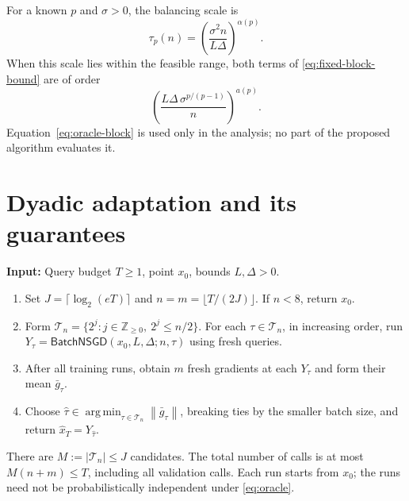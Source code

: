 \documentclass[11pt,a4paper]{article}
\newcommand{\cT}{\mathcal{T}}
\newcommand{\norm}[1]{\left\lVert #1\right\rVert}
\newcommand{\FB}{\mathsf{BatchNSGD}}
\DeclareMathOperator*{\argmin}{arg\,min}
\theoremstyle{definition}
\theoremstyle{remark}
\begin{document}
For a known $p$ and $\sigma>0$, the balancing scale is
\begin{equation}\label{eq:oracle-block}
 \tau_p(n)=\left(\frac{\sigma^2n}{L\Delta}\right)^{\alpha(p)}.
\end{equation}
When this scale lies within the feasible range, both terms of
\eqref{eq:fixed-block-bound} are of order
\begin{equation}\label{eq:balanced-value}
 \left(\frac{L\Delta\,\sigma^{p/(p-1)}}{n}\right)^{a(p)}.
\end{equation}
Equation~\eqref{eq:oracle-block} is used only in the analysis; no part
of the proposed algorithm evaluates it.

\section{Dyadic adaptation and its guarantees}\label{sec:main-upper}

\begin{algorithm}[H]
\caption{Dyadic batch-size portfolio $\mathsf A_{\rm dyad}$}
\label{alg:portfolio}
\textbf{Input:} Query budget $T\ge1$, point $x_0$, bounds $L,\Delta>0$.
\begin{enumerate}[label=\arabic*.,itemsep=0.25em,topsep=0.3em]
\item Set $J=\lceil\log_2(eT)\rceil$ and
$n=m=\lfloor T/(2J)\rfloor$. If $n<8$, return $x_0$.
\item Form $\cT_n=\{2^j:j\in\mathbb Z_{\ge0},\ 2^j\le n/2\}$.
For each $\tau\in\cT_n$, in increasing order, run
$Y_\tau=\FB(x_0,L,\Delta;n,\tau)$ using fresh queries.
\item After all training runs, obtain $m$ fresh gradients at each
$Y_\tau$ and form their mean $\bar g_\tau$.
\item Choose $\widehat\tau\in\argmin_{\tau\in\cT_n}\norm{\bar g_\tau}$,
breaking ties by the smaller batch size, and return
$\widehat x_T=Y_{\widehat\tau}$.
\end{enumerate}
\end{algorithm}

There are $M:=|\cT_n|\le J$ candidates. The total number of calls is
at most $M(n+m)\le T$, including all validation calls.
Each run starts from $x_0$; the runs need not be probabilistically
independent under \eqref{eq:oracle}.
\end{document}
